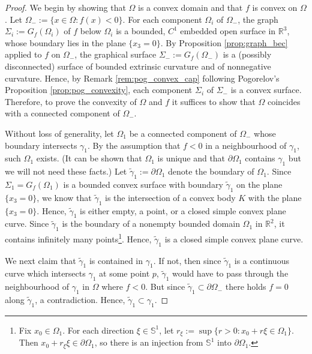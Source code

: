 \documentclass[12pt]{article}
\newcommand{\R}{\mathbb{R}}
\theoremstyle{plain}
\numberwithin{equation}{section}
\begin{document}
\begin{proof}
    We begin by showing that $\Omega$ is a convex domain and that $f$ is convex on $\Omega$. Let $\Omega_- := \{x \in \Omega : f(x) < 0\}$. For each component $\Omega_i$ of $\Omega_-$, the graph $\Sigma_i := G_f(\Omega_i)$ of $f$ below $\Omega_i$ is a bounded, $C^1$ embedded open surface in $\R^3$, whose boundary lies in the plane $\{x_3 = 0\}$. By Proposition \ref{prop:graph_bec} applied to $f$ on $\Omega_-$, the graphical surface $\Sigma_- := G_f(\Omega_-)$ is a (possibly disconnected) surface of bounded extrinsic curvature and of nonnegative curvature. Hence, by Remark \ref{rem:pog_convex_cap} following Pogorelov's Proposition \ref{prop:pog_convexity}, each component $\Sigma_i$ of $\Sigma_-$ is a convex surface. Therefore, to prove the convexity of $\Omega$ and $f$ it suffices to show that $\Omega$ coincides with a connected component of $\Omega_-$.
    
    Without loss of generality, let $\Omega_1$ be a connected component of $\Omega_-$ whose boundary intersects $\gamma_1$. By the assumption that $f < 0$ in a neighbourhood of $\gamma_1$, such $\Omega_1$ exists. (It can be shown that $\Omega_1$ is unique and that $\partial \Omega_1$ contains $\gamma_1$ but we will not need these facts.) Let $\tilde\gamma_1 := \partial \Omega_1$ denote the boundary of $\Omega_1$. Since $\Sigma_1 = G_f(\Omega_1)$ is a bounded convex surface with boundary $\tilde\gamma_1$ on the plane $\{x_3 = 0\}$, we know that $\tilde\gamma_1$ is the intersection of a convex body $K$ with the plane $\{x_3 = 0\}$. Hence, $\tilde\gamma_1$ is either empty, a point, or a closed simple convex plane curve. Since $\tilde\gamma_1$ is the boundary of a nonempty bounded domain $\Omega_1$ in $\R^2$, it contains infinitely many points\footnote{Fix $x_0 \in \Omega_1$. For each direction $\xi \in \mathbb{S}^1$, let $r_\xi := \sup \{r > 0: x_0 + r\xi \in \Omega_1\}$. Then $x_0 + r_\xi \xi \in \partial \Omega_1$, so there is an injection from $\mathbb{S}^1$ into $\partial \Omega_1$.}. Hence, $\tilde\gamma_1$ is a closed simple convex plane curve. 

    We next claim that $\tilde\gamma_1$ is contained in $\gamma_1$. If not, then since $\tilde\gamma_1$ is a continuous curve which intersects $\gamma_1$ at some point $p$, $\tilde\gamma_1$ would have to pass through the neighbourhood of $\gamma_1$ in $\Omega$ where $f < 0$. But since $\tilde\gamma_1 \subset \partial \Omega_-$ there holds $f = 0$ along $\tilde\gamma_1$, a contradiction. Hence, $\tilde\gamma_1 \subset \gamma_1$.


\end{proof}
\end{document}
